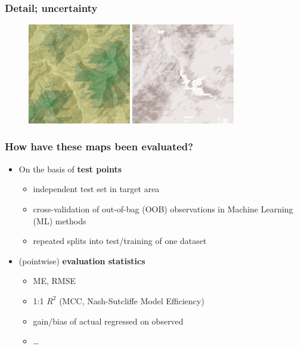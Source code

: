 \documentclass[aspectratio=169, 10pt]{beamer}
\begin{document}
\begin{frame}
  \frametitle{Detail; uncertainty}
\begin{figure}
\includegraphics[width=0.4\textwidth]{./graphics_david/SoilGridsDetail.png}
\hfill
\includegraphics[width=0.4\textwidth]{./graphics_david/SoilGridsUncertainty.png}
\end{figure}
\end{frame}

\begin{frame}
  \frametitle{How have these maps been evaluated?}
    \begin{itemize}
        \item On the basis of \textbf{test points}
        \begin{itemize}
            \item independent test set in target area
            \item cross-validation of out-of-bag (OOB) observations in Machine Learning (ML) methods
            \item repeated splits into test/training of one dataset
        \end{itemize}
      \item (pointwise) \textbf{evaluation statistics}
        \begin{itemize}
        \item ME, RMSE
        \item 1:1 $R^2$ (MCC, Nash-Sutcliffe Model
          Efficiency)
        \item gain/bias of actual regressed on observed
        \item \ldots
        \end{itemize}
    \end{itemize}
\end{frame}
\end{document}
